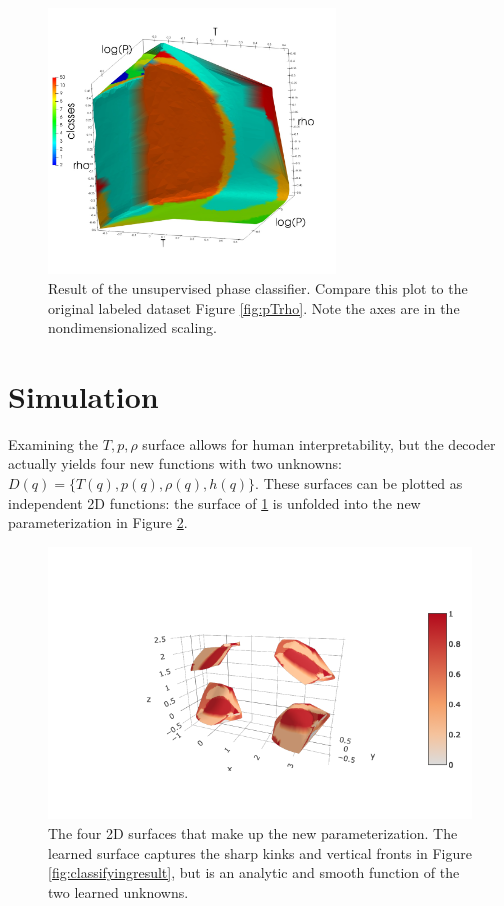 \documentclass[AMA,STIX1COL]{WileyNJD-v2}
\begin{document}
\begin{figure}
  \centering
  \includegraphics[width=3in]{../slides/classifier_good.jpg}
  \caption{\label{fig:classified}Result of the unsupervised phase
    classifier. Compare this plot to the original labeled dataset
    Figure \ref{fig:pTrho}. Note the axes are in the
    nondimensionalized scaling.}
\end{figure}

\hypertarget{header-n3321}{%
\section{Simulation}\label{header-n3321}}

Examining the $T,p,\rho$ surface allows for human interpretability, but
the decoder actually yields four new functions with two unknowns:
$D(q)=\{T(q),p(q),\rho(q),h(q)\}$. These surfaces can be plotted as
independent 2D functions: the surface of \ref{fig:classified} is
unfolded into the new parameterization in Figure \ref{fig:foursurfaces}.
\begin{figure}
  \centering
  \includegraphics{../slides/water_four_surfaces_plot.png}
  \caption{\label{fig:foursurfaces}The four 2D surfaces that make up
    the new parameterization. The learned surface captures the sharp
    kinks and vertical fronts in Figure \ref{fig:classifyingresult},
    but is an analytic and smooth function of the two learned unknowns.}
  \end{figure}
\end{document}
